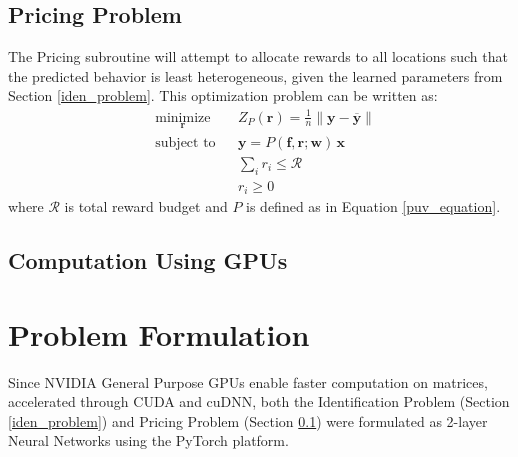 \documentclass[12pt]{article}
\newcommand{\vect}[1]{\mathbf{#1}}
\newcommand{\matr}[1]{\mathbf{#1}}
\newcommand{\mean}[1]{\overline{#1}}
\begin{document}
    \subsection{Pricing Problem} \label{pricing_problem}
    The Pricing subroutine will attempt to allocate rewards to all locations such that the predicted behavior is least heterogeneous, given the learned parameters from Section \ref{iden_problem}. This optimization problem can be written as:
    \begin{equation}
    \begin{aligned}
    & \underset{\vect{r}}{\text{minimize}}
    & & Z_P(\vect{r}) = \frac{1}{n}\lVert \vect{y} - \mean{\vect{y}} \rVert\\
    & \text{subject to}
    & & \vect{y} = P(\matr{f}, \vect{r}; \matr{w}) \, \vect{x}\\
    &&& \sum_{i} r_i \leq \mathcal{R}\\
    &&& r_i \geq 0
    \end{aligned}
    \end{equation}
    where $\mathcal{R}$ is total reward budget and $P$ is defined as in Equation \ref{puv_equation}.
    
    
    \subsection{Computation Using GPUs} \label{comp_using_GPUs}
    
    \section{Problem Formulation}
    Since NVIDIA General Purpose GPUs enable faster computation on matrices, accelerated through CUDA and cuDNN, both the Identification Problem (Section \ref{iden_problem}) and Pricing Problem (Section \ref{pricing_problem}) were formulated as 2-layer Neural Networks using the PyTorch platform.
    
\end{document}
